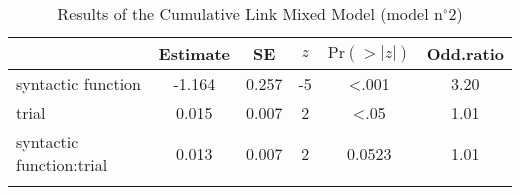 \begin{table}
\begin{tabular}{l S[table-format=-1.3] S[table-format=1.3] S[table-format=-1] S[table-format=<1.3] S[table-format=1.2]}
  \lsptoprule
 & {Estimate} & {SE} & {$z$} & {$\text{Pr}(>|z|)$} & {Odd.ratio} \\ 
  \midrule
  syntactic function & -1.164 & 0.257 & -5 & <.001 & 3.20 \\ 
  trial & 0.015 & 0.007 & 2 & <.05 & 1.01 \\ 
  syntactic function:trial & 0.013 & 0.007 & 2 & 0.0523 & 1.01 \\ 
   \lspbottomrule
\end{tabular}
\caption{Results of the Cumulative Link Mixed Model (model n$^{\circ}$2)}
\label{tab:exp08-m1b}
\end{table}
